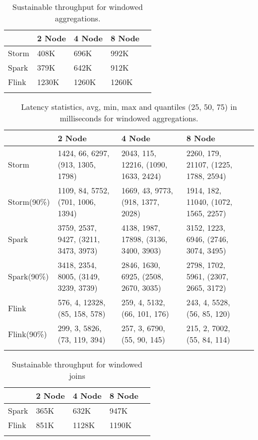     \begin{table}[H]
        \begin{tabular}{lllll}\toprule
            &\textbf{2 Node}  & \textbf{4 Node} & \textbf{8 Node}\\\midrule
            Storm & 408K & 696K & 992K  \\
            Spark & 379K & 642K & 912K  \\
            Flink & 1230K & 1260K & 1260K  \\
            \\\bottomrule
        \end{tabular}
        \caption{Sustainable throughput for windowed aggregations. }
        \label{tab_th_agg}
    \end{table} 



    \begin{table*}
        \begin{tabular}{lllll}\toprule
            &\textbf{2 Node}  & \textbf{4 Node} & \textbf{8 Node}\\\midrule
            Storm & 1424, 66, 6297, (913, 1305, 1798) & 2043, 115, 12216, (1090, 1633, 2424) & 2260, 179, 21107, (1225, 1788, 2594) \\
            Storm(90\%) & 1109, 84, 5752, (701, 1006, 1394) & 1669, 43, 9773, (918, 1377, 2028) & 1914, 182, 11040, (1072, 1565, 2257) \\
            Spark & 3759, 2537, 9427, (3211, 3473, 3973) & 4138, 1987, 17898, (3136, 3400, 3903) & 3152, 1223, 6946, (2746, 3074, 3495)\\
            Spark(90\%) & 3418, 2354, 8005, (3149, 3239, 3739) & 2846, 1630, 6925, (2508, 2670, 3035) & 2798, 1702, 5961, (2307, 2665, 3172)\\
            Flink & 576, 4, 12328, (85, 158, 578) & 259, 4, 5132, (66, 101, 176) & 243, 4, 5528, (56, 85, 120) \\
            Flink(90\%) & 299, 3, 5826, (73, 119, 394) & 257, 3, 6790, (55, 90, 145)  & 215, 2, 7002, (55, 84, 114) \\
            \\\bottomrule
        \end{tabular}
        \caption{ Latency statistics, avg, min, max and quantiles (25, 50, 75) in milliseconds for windowed aggregations.}
         \label{tab_lat_agg}
    \end{table*} 


    \begin{table}[H]
        \begin{tabular}{lllll}\toprule
            &\textbf{2 Node}  & \textbf{4 Node} & \textbf{8 Node}\\\midrule
            Spark & 365K & 632K & 947K  \\
            Flink & 851K & 1128K & 1190K \\
            \\\bottomrule
        \end{tabular}
        \caption{Sustainable throughput for windowed joins}
                 \label{tab_th_join}
    \end{table} 



